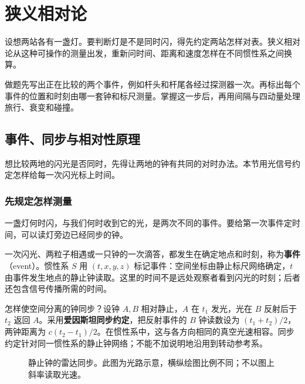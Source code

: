 \chapter{狭义相对论}\label{ch:relativity}
\begin{guidebox}
设想两站各有一盏灯。要判断灯是不是同时闪，得先约定两站怎样对表。狭义相对论从这种可操作的测量出发，重新问时间、距离和速度怎样在不同惯性系之间换算。

做题先写出正在比较的两个事件，例如杆头和杆尾各经过探测器一次。再标出每个事件的位置和时刻由哪一套钟和标尺测量。掌握这一步后，再用间隔与四动量处理旅行、衰变和碰撞。
\end{guidebox}

\section{事件、同步与相对性原理}
想比较两地的闪光是否同时，先得让两地的钟有共同的对时办法。本节用光信号约定怎样给每一次闪光标上时间。

\subsection{先规定怎样测量}
一盏灯何时闪，与我们何时收到它的光，是两次不同的事件。要给第一次事件定时间，可以读灯旁边已经同步的钟。

一次闪光、两粒子相遇或一只钟的一次滴答，都发生在确定地点和时刻，称为\textbf{事件}（event）。惯性系 $S$ 用 $(t,x,y,z)$ 标记事件：空间坐标由静止标尺网络确定，$t$ 由事件发生地点的静止钟读取。这里的时间不是远处观察者看到闪光的时刻；后者还包含信号传播所需的时间。

怎样使空间分离的钟同步？设钟 $A,B$ 相对静止，$A$ 在 $t_1$ 发光，光在 $B$ 反射后于 $t_2$ 返回 $A$。采用\textbf{爱因斯坦同步约定}，把反射事件的 $B$ 钟读数设为 $(t_1+t_2)/2$，两钟距离为 $c(t_2-t_1)/2$。在惯性系中，这与各方向相同的真空光速相容。同步约定针对同一惯性系的静止钟网络；不能不加说明地沿用到转动参考系。

\begin{figure}[htbp]\centering
{}
\caption{静止钟的雷达同步。此图为光路示意，横纵绘图比例不同；不以图上斜率读取光速。}\label{fig:sr-sync}
\end{figure}

